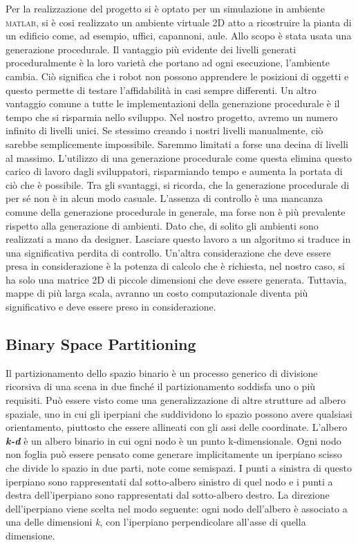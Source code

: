 
Per la realizzazione del progetto si è optato per un simulazione in ambiente \textsc{matlab}, si è cosi realizzato un ambiente virtuale 2D atto a ricostruire la pianta di un edificio come, ad esempio, uffici, capannoni, aule. Allo scopo è stata usata una generazione procedurale.
Il vantaggio più evidente dei livelli generati proceduralmente è la loro varietà che portano ad ogni esecuzione, l'ambiente cambia. Ciò significa che i robot non possono apprendere le posizioni di oggetti e questo permette di testare l'affidabilità in casi sempre differenti.
Un altro vantaggio comune a tutte le implementazioni della generazione procedurale è il tempo che si risparmia nello sviluppo. Nel nostro progetto, avremo un numero infinito di livelli unici. Se stessimo creando i nostri livelli manualmente, ciò sarebbe semplicemente impossibile. Saremmo limitati a forse una decina di livelli al massimo.
L'utilizzo di una generazione procedurale come questa elimina questo carico di lavoro dagli sviluppatori, risparmiando tempo e aumenta la portata di ciò che è possibile.
Tra gli svantaggi, si ricorda, che la generazione procedurale di per sé non è in alcun modo casuale. 
L'assenza di controllo è una mancanza comune della generazione procedurale in generale, ma forse non è più prevalente rispetto alla generazione di ambienti. Dato che, di solito gli ambienti sono realizzati a mano da designer. Lasciare questo lavoro a un algoritmo si traduce in una significativa perdita di controllo.
Un'altra considerazione che deve essere presa in considerazione è la potenza di calcolo che è richiesta, nel nostro caso, si ha solo una matrice 2D di piccole dimensioni che deve essere generata. Tuttavia, mappe di più larga scala, avranno un costo computazionale diventa più significativo e deve essere preso in considerazione.\cite{green2016procedural}

\subsection{Binary Space Partitioning}
Il partizionamento dello spazio binario è un processo generico di divisione ricorsiva di una scena in due finché il partizionamento soddisfa uno o più requisiti. Può essere visto come una generalizzazione di altre strutture ad albero spaziale, uno in cui gli iperpiani che suddividono lo spazio possono avere qualsiasi orientamento, piuttosto che essere allineati con gli assi delle coordinate.\cite{wiki:bsp}
L'albero \textbf{\emph{k-d}} è un albero binario in cui ogni nodo è un punto k-dimensionale. Ogni nodo non foglia può essere pensato come generare implicitamente un iperpiano scisso che divide lo spazio in due parti, note come semispazi. I punti a sinistra di questo iperpiano sono rappresentati dal sotto-albero sinistro di quel nodo e i punti a destra dell'iperpiano sono rappresentati dal sotto-albero destro. La direzione dell'iperpiano viene scelta nel modo seguente: ogni nodo dell'albero è associato a una delle dimensioni \emph{k}, con l'iperpiano perpendicolare all'asse di quella dimensione.\cite{wiki:kdtree}

